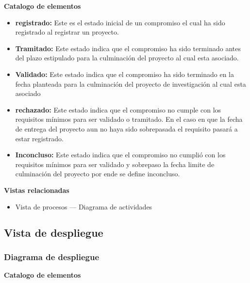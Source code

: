 \documentclass[12pt,oneside,letterpaper]{report}
\begin{document}
\textbf{Catalogo de elementos}
\begin{itemize}
 \item \textbf{registrado:} Este es el estado inicial de un compromiso  el cual ha sido registrado al registrar un proyecto.
 \item \textbf{Tramitado:} Este estado indica que el compromiso ha sido terminado antes del plazo estipulado para la culminación del proyecto al cual esta asociado.
 \item \textbf{Validado:} Este estado indica que el compromiso ha sido terminado en la fecha planteada para la culminación del proyecto de investigación al cual esta asociado
 \item \textbf{rechazado:} Este estado indica que el compromiso no cumple con los requisitos mínimos para ser validado o tramitado. En el caso en que la fecha de entrega del proyecto aun no haya sido sobrepasada el requisito pasará a estar registrado.
 \item \textbf{Inconcluso:} Este estado indica que el compromiso no cumplió con los requisitos mínimos para ser validado y sobrepaso la fecha limite de culminación del proyecto por ende se define inconcluso.
\end{itemize}





\textbf{Vistas relacionadas}
\begin{itemize}
 \item Vista de procesos --- Diagrama de actividades
\end{itemize}


\subsection{Vista de despliegue}

\subsubsection{Diagrama de despliegue}


\textbf{Catalogo de elementos}
\end{document}
